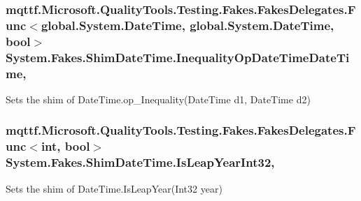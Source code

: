\hypertarget{class_system_1_1_fakes_1_1_shim_date_time_a0b6327ff3ee4df6b3417b3ac7446febb}{
\subsubsection[{Inequality\-Op\-Date\-Time\-Date\-Time}]{\setlength{\rightskip}{0pt plus 5cm}mqttf.\-Microsoft.\-Quality\-Tools.\-Testing.\-Fakes.\-Fakes\-Delegates.\-Func$<$global.\-System.\-Date\-Time, global.\-System.\-Date\-Time, bool$>$ System.\-Fakes.\-Shim\-Date\-Time.\-Inequality\-Op\-Date\-Time\-Date\-Time\hspace{0.3cm}{\ttfamily [static]}, {\ttfamily [set]}}}\label{class_system_1_1_fakes_1_1_shim_date_time_a0b6327ff3ee4df6b3417b3ac7446febb}


Sets the shim of Date\-Time.\-op\-\_\-\-Inequality(\-Date\-Time d1, Date\-Time d2)

\hypertarget{class_system_1_1_fakes_1_1_shim_date_time_a36fa550237bc42aae874846cccb3ac3e}{
\subsubsection[{Is\-Leap\-Year\-Int32}]{\setlength{\rightskip}{0pt plus 5cm}mqttf.\-Microsoft.\-Quality\-Tools.\-Testing.\-Fakes.\-Fakes\-Delegates.\-Func$<$int, bool$>$ System.\-Fakes.\-Shim\-Date\-Time.\-Is\-Leap\-Year\-Int32\hspace{0.3cm}{\ttfamily [static]}, {\ttfamily [set]}}}\label{class_system_1_1_fakes_1_1_shim_date_time_a36fa550237bc42aae874846cccb3ac3e}


Sets the shim of Date\-Time.\-Is\-Leap\-Year(\-Int32 year)

